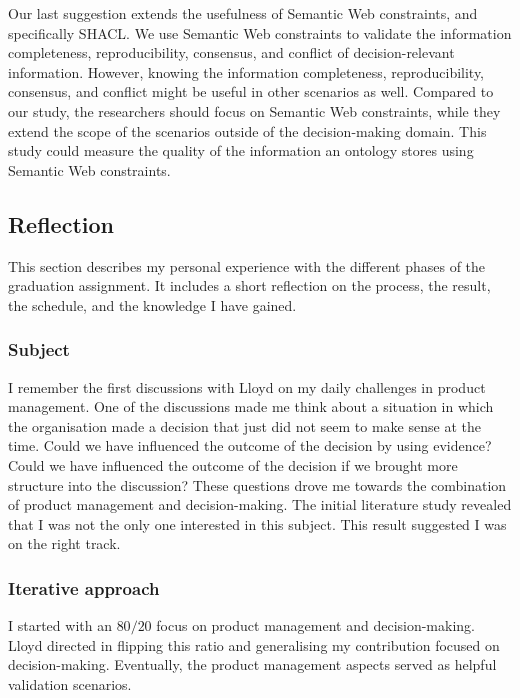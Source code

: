 Our last suggestion extends the usefulness of Semantic Web constraints, and specifically SHACL. We use Semantic Web constraints to validate the information completeness, reproducibility, consensus, and conflict of decision-relevant information. However, knowing the information completeness, reproducibility, consensus, and conflict might be useful in other scenarios as well. Compared to our study, the researchers should focus on Semantic Web constraints, while they extend the scope of the scenarios outside of the decision-making domain. This study could measure the quality of the information an ontology stores using Semantic Web constraints.

\subsection{Reflection}
This section describes my personal experience with the different phases of the graduation assignment. It includes a short reflection on the process, the result, the schedule, and the knowledge I have gained.

\subsubsection{Subject}
I remember the first discussions with Lloyd on my daily challenges in product management. One of the discussions made me think about a situation in which the organisation made a decision that just did not seem to make sense at the time. Could we have influenced the outcome of the decision by using evidence? Could we have influenced the outcome of the decision if we brought more structure into the discussion? These questions drove me towards the combination of product management and decision-making. The initial literature study revealed that I was not the only one interested in this subject. This result suggested I was on the right track.

\subsubsection{Iterative approach}
I started with an $80/20$ focus on product management and decision-making. Lloyd directed in flipping this ratio and generalising my contribution focused on decision-making. Eventually, the product management aspects served as helpful validation scenarios. 

